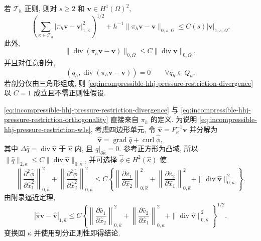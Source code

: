 \begin{Theorem}\label{thm:incompressible-hhj-pressure-restriction}
若 $\mathcal T_h$ 正则, 则对 $s\geq2$ 和
$\mathbf v\in H^1(\Omega)^2$,
\begin{equation}\label{eq:incompressible-hhj-pressure-restriction-w1s}
\left(\sum_{\kappa\in\mathcal T_h}
|\pi_h\mathbf v-\mathbf v|_{1,\kappa}^2\right)^{1/2}
+h^{-1}\|\pi_h\mathbf v-\mathbf v\|_{0,s,\Omega}
\leq C(s)|\mathbf v|_{1,s,\Omega}.
\end{equation}
此外,
\begin{equation}\label{eq:incompressible-hhj-pressure-restriction-divergence}
\|\operatorname{div}(\pi_h\mathbf v-\mathbf v)\|_{0,\Omega}
\leq C\|\operatorname{div}\mathbf v\|_{0,\Omega},
\end{equation}
并且对任意剖分,
\begin{equation}\label{eq:incompressible-hhj-pressure-restriction-orthogonality}
(q_h,\operatorname{div}(\pi_h\mathbf v-\mathbf v))=0
\qquad\forall q_h\in Q_h.
\end{equation}
若剖分仅由三角形组成, 则
\eqref{eq:incompressible-hhj-pressure-restriction-divergence}
以 $C=1$ 成立且不需正则性假设.
\end{Theorem}

\begin{Proof}
\eqref{eq:incompressible-hhj-pressure-restriction-divergence}
与 \eqref{eq:incompressible-hhj-pressure-restriction-orthogonality}
直接来自 $\pi_h$ 的定义. 为说明
\eqref{eq:incompressible-hhj-pressure-restriction-w1s},
考虑四边形单元, 令
$\widehat{\mathbf v}=F_\kappa^{-1}\mathbf v$ 并分解为
\begin{equation}\label{eq:incompressible-hhj-pressure-reference-decomposition}
\widehat{\mathbf v}=\operatorname{grad}\widehat q
+\operatorname{curl}\widehat\phi,
\end{equation}
其中
$\Delta\widehat q=\operatorname{div}\widehat{\mathbf v}$ 于
$\widehat\kappa$ 内, 且
$\widehat q|_{\partial\widehat\kappa}=0$.
参考正方形为凸域, 所以
$\|\widehat q\|_{2,\widehat\kappa}
\leq C\|\operatorname{div}\widehat{\mathbf v}\|_{0,\widehat\kappa}$,
并可选择 $\widehat\phi\in H^2(\widehat\kappa)$ 使
\[
\left\|\frac{\partial^2\widehat\phi}{\partial\widehat x_1^2}\right\|_{0,\widehat\kappa}^2
+\left\|\frac{\partial^2\widehat\phi}{\partial\widehat x_2^2}\right\|_{0,\widehat\kappa}^2
\leq C\left\{
\left\|\frac{\partial\widehat v_1}{\partial\widehat x_2}\right\|_{0,\widehat\kappa}^2
+\left\|\frac{\partial\widehat v_2}{\partial\widehat x_1}\right\|_{0,\widehat\kappa}^2
+\|\operatorname{div}\widehat{\mathbf v}\|_{0,\widehat\kappa}^2
\right\}.
\]
由附录逼近定理,
\begin{equation}\label{eq:incompressible-hhj-pressure-reference-estimate}
|\widehat\pi\widehat{\mathbf v}-\widehat{\mathbf v}|_{1,\widehat\kappa}
\leq C\left\{
\left\|\frac{\partial\widehat v_1}{\partial\widehat x_2}\right\|_{0,\widehat\kappa}^2
+\left\|\frac{\partial\widehat v_2}{\partial\widehat x_1}\right\|_{0,\widehat\kappa}^2
+\|\operatorname{div}\widehat{\mathbf v}\|_{0,\widehat\kappa}^2
\right\}^{1/2}.
\end{equation}
变换回 $\kappa$ 并使用剖分正则性即得结论.
\end{Proof}

